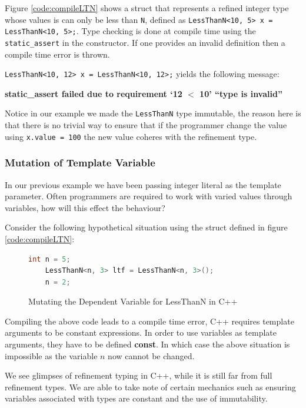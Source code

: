 \documentclass[a4paper,12pt]{report}
\begin{document}
\par
Figure \ref{code:compileLTN} shows a struct that represents a refined integer 
type whose values is can only be less than \verb|N|, defined as 
\verb|LessThanN<10, 5> x = LessThanN<10, 5>;|. Type checking is done at compile 
time using the \verb|static_assert| in the constructor. If one provides an 
invalid definition then a compile time error is thrown. 

\par
\verb|LessThanN<10, 12> x = LessThanN<10, 12>;| yields the following message: 
\par
\textbf{static\_assert failed due to requirement `12 $<$ 10' ``type is invalid''}

\par
Notice in our example we made the \verb|LessThanN| type immutable, the reason 
here is that there is no trivial way to ensure that if the programmer change the 
value using \verb|x.value = 100| the new value coheres with the refinement 
type.

\subsubsection{Mutation of Template Variable}
In our previous example we have been passing integer literal as the template 
parameter. Often programmers are required to 
work with varied values through variables, how will this effect the behaviour? 

\par
Consider the following hypothetical situation using the struct defined in 
figure \ref{code:compileLTN}: 

\begin{figure}[H]
  \begin{lstlisting}[language=c++]     
    int n = 5;
    LessThanN<n, 3> ltf = LessThanN<n, 3>();
    n = 2;
  \end{lstlisting}
  \caption{Mutating the Dependent Variable for LessThanN in C++}
\end{figure}

\par
Compiling the above code leads to a compile time error, C++ requires template 
arguments to be constant expressions. In order to use variables as template 
arguments, they have to be defined \textbf{const}. In which case the above 
situation is impossible as the variable $n$ now cannot be changed. 

\par
We see glimpses of refinement typing in C++, while it is still far from full 
refinement types. We are able to take note of certain mechanics such as ensuring 
variables associated with types are constant and the use of immutability. 
\end{document}
